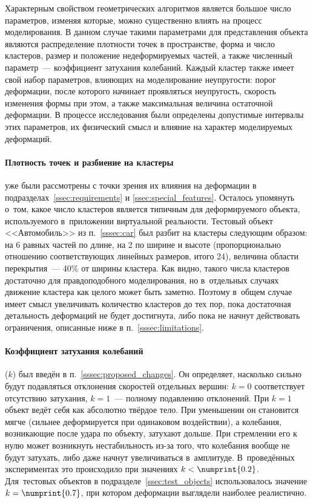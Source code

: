 \documentclass[a4paper, 14pt, titlepage]{extarticle}
\newcommand{\num}[1]{\numprint{#1}}
\begin{document}
      Характерным свойством геометрических алгоритмов является большое число параметров, изменяя
      которые, можно существенно влиять на процесс моделирования.  В данном случае такими
      параметрами для представления объекта являются распределение плотности точек в
      пространстве, форма и число кластеров, размер и положение недеформируемых частей, а также
      численный параметр~--- коэффициент затухания колебаний. Каждый кластер также имеет свой набор
      параметров, влияющих на моделирование неупругости: порог деформации, после которого начинает
      проявляться неупругость, скорость изменения формы при этом, а также максимальная величина
      остаточной деформации. В процессе исследования были определены допустимые интервалы этих
      параметров, их физический смысл и влияние на характер моделируемых деформаций.

      \paragraph{Плотность точек и разбиение на кластеры} уже были рассмотрены с точки зрения
      их влияния на деформации в подразделах~\ref{ssec:requirements} и \ref{ssec:special_features}.
      Осталось упомянуть о~том, какое число кластеров является типичным для
      деформируемого объекта, используемого в~приложении виртуальной реальности. Тестовый
      объект <<Автомобиль>> из п.~\ref{sssec:car} был разбит на кластеры следующим образом: на 6
      равных частей по длине, на 2 по ширине и высоте (пропорционально отношению соответствующих
      линейных размеров, итого 24), величина области перекрытия~--- 40\% от ширины кластера.
      Как видно, такого числа кластеров достаточно для правдоподобного моделирования, но
      в~отдельных случаях движение кластера как целого может быть заметно. Поэтому в~общем случае
      имеет смысл увеличивать количество кластеров до тех пор, пока достаточная детальность
      деформаций не будет достигнута, либо пока не начнут действовать ограничения, описанные ниже в
      п.~\ref{sssec:limitations}.

      \paragraph{Коэффициент затухания колебаний} ($k$) был введён в п.~\ref{sssec:proposed_changes}.
      Он определяет, насколько сильно будут подавляться отклонения скоростей отдельных вершин: $k = 0$
      соответствует отсутствию затухания, $k = 1$~--- полному подавлению отклонений. При $k = 1$
      объект ведёт себя как абсолютно твёрдое тело. При уменьшении он становится мягче (сильнее
      деформируется при одинаковом воздействии), а колебания, возникающие после удара по объекту,
      затухают дольше. При стремлении его к нулю может возникнуть нестабильность из-за того, что
      колебания вообще не будут затухать, либо даже начнут увеличиваться в~амплитуде. В~проведённых
      экспериментах это происходило при значениях $k < \num{0.2}$. Для~тестовых объектов
      в подразделе~\ref{ssec:test_objects} использовалось значение $k = \num{0.7}$, при котором деформации
      выглядели наиболее реалистично.
\end{document}
